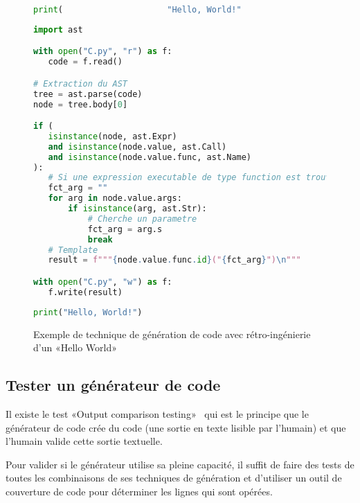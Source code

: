 \begin{figure}
\begin{lstlisting}[language=Python, upquote=true, caption={C mal formaté - fichier C.py de Figure~\ref{fig:exemple_gen_code_retro}}, label={lst:gen_code_retro_c}]
print(                     "Hello, World!"                         )
\end{lstlisting}

\begin{lstlisting}[language=Python, upquote=true, caption={M qui extrait µ$_C$ pour générer C.py de Figure~\ref{fig:exemple_gen_code_retro}}, label={lst:gen_code_retro_m}]
import ast

with open("C.py", "r") as f:
   code = f.read()

# Extraction du AST
tree = ast.parse(code)
node = tree.body[0]

if (
   isinstance(node, ast.Expr)
   and isinstance(node.value, ast.Call)
   and isinstance(node.value.func, ast.Name)
):
   # Si une expression executable de type function est trouve
   fct_arg = ""
   for arg in node.value.args:
       if isinstance(arg, ast.Str):
           # Cherche un parametre
           fct_arg = arg.s
           break
   # Template
   result = f"""{node.value.func.id}("{fct_arg}")\n"""

with open("C.py", "w") as f:
   f.write(result)
\end{lstlisting}

\begin{lstlisting}[language=Python, upquote=true, caption={C corrigé - fichier C.py de Figure~\ref{fig:exemple_gen_code_retro}}, label={lst:gen_code_retro_new_c}]
print("Hello, World!")
\end{lstlisting}
\caption{Exemple de technique de génération de code avec rétro-ingénierie d'un «Hello World»}
\label{fig:exemple_gen_code_retro}
\end{figure}

\subsection{Tester un générateur de code}

Il existe le test «Output comparison testing»~\cite{wikipedia_test_informatique} qui est le principe que le générateur de code crée du code (une sortie en texte lisible par l'humain) et que l'humain valide cette sortie textuelle.

Pour valider si le générateur utilise sa pleine capacité, il suffit de faire des tests de toutes les combinaisons de ses techniques de génération et d'utiliser un outil de couverture de code pour déterminer les lignes qui sont opérées.

